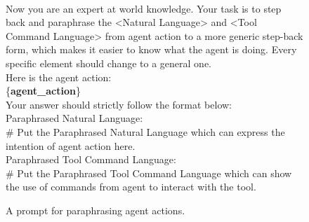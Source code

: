\begin{figure*}[ht]
    \centering
    \begin{tcolorbox}[
        title=\texttt{Prompt for Paraphrasing Agent Action},
        width=\textwidth %
    ]
    \begin{flushleft}
    [System]\\
        Now you are an expert at world knowledge. Your task is to step back and paraphrase the <Natural Language> and <Tool Command Language> from agent action to a more generic step-back form, which makes it easier to know what the agent is doing. Every specific element should change to a general one.\\
        \vspace{1em}
        Here is the agent action:\\
        \{\textbf{agent\_action}\}\
        \vspace{1em}\\
        Your answer should strictly follow the format below:\\
        \vspace{1em}
        Paraphrased Natural Language:\\
        \# Put the Paraphrased Natural Language which can express the intention of agent action here.\\
        \vspace{1em}
        Paraphrased Tool Command Language:\\
        \# Put the Paraphrased Tool Command Language which can show the use of commands from agent to interact with the tool.\\
    \end{flushleft}
    \end{tcolorbox}
    \caption{A prompt for paraphrasing agent actions.}
    \label{app:fig:prompt_paraphrase_agent_action}
\end{figure*}












